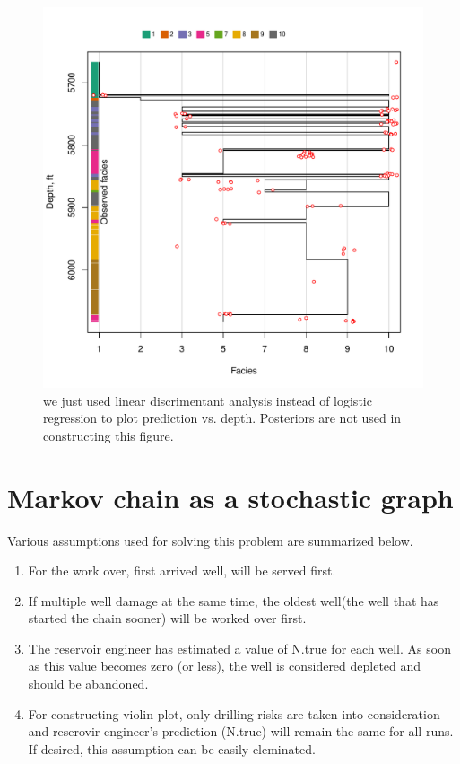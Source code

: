 \documentclass[paper=a4, fontsize=12pt]{scrartcl}\usepackage{graphicx, color}
\numberwithin{equation}{section} %
\numberwithin{figure}{section} %
\numberwithin{table}{section} %
\begin{document}
\begin{figure}[htbp]
\begin{center}
\includegraphics[width=\linewidth]{LDAfit.pdf}
\caption{we just used linear discrimentant analysis instead of logistic regression to plot prediction vs. depth. Posteriors are not used in constructing this figure.}
\label{simPlot}
\end{center}
\end{figure}






\section{Markov chain as a stochastic graph}
Various assumptions used for solving this problem are summarized below. 
\begin{enumerate}
\item For the work over, first arrived well, will be served first.
\item If multiple well damage at the same time, the oldest well(the well that has started the chain sooner) will be worked over first. 
\item The reservoir engineer has estimated a value of N.true for each well. As soon as this value becomes zero (or less), the well is considered depleted and should be abandoned. 
\item For constructing violin plot, only drilling risks are taken into consideration and reserovir engineer's prediction (N.true) will remain the same for all runs. If desired, this assumption can be easily eleminated.   
\end{enumerate}
\end{document}
